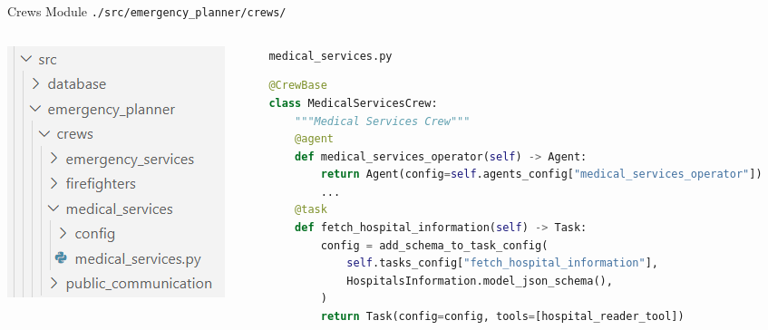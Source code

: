 \begin{frame}[fragile]{Crews Module}
    \texttt{./src/emergency\_planner/crews/}
    \begin{columns}[T]
      \begin{column}{0.3\textwidth}
          \includegraphics[width=\textwidth]{figures/crews_modules_folders.png}
      \end{column}
      \begin{column}{0.68\textwidth}
        \texttt{medical\_services.py}
        \begin{lstlisting}[language=Python, breaklines=true]
@CrewBase
class MedicalServicesCrew:
    """Medical Services Crew"""
    @agent
    def medical_services_operator(self) -> Agent:
        return Agent(config=self.agents_config["medical_services_operator"])
        ...
    @task
    def fetch_hospital_information(self) -> Task:
        config = add_schema_to_task_config(
            self.tasks_config["fetch_hospital_information"],
            HospitalsInformation.model_json_schema(),
        )
        return Task(config=config, tools=[hospital_reader_tool])
        \end{lstlisting}
      \end{column}
    \end{columns}
\end{frame}